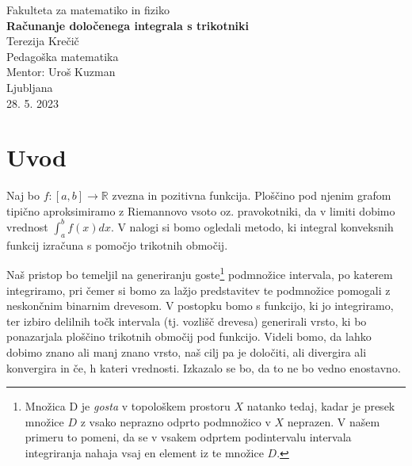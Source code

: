\documentclass[a4paper, 12pt, titlepage]{article}
\begin{document}
\begin{titlepage}
    \begin{center}
        \large
        Fakulteta za matematiko in fiziko\\
        \vspace{8cm}
        \Huge
        \textbf{Računanje določenega integrala s trikotniki} \\
        \vspace{7cm}
        \large
        Terezija Krečič\\
        Pedagoška matematika\\
        \vspace{1cm}
        Mentor: Uroš Kuzman\\
        \vspace{0.5cm}
        Ljubljana\\
        28. 5. 2023
    \end{center}
\end{titlepage}

\tableofcontents
\newpage

\section{Uvod}

Naj bo $ f: [a,b] \rightarrow \mathbb{R} $ zvezna in pozitivna funkcija. Ploščino pod njenim grafom tipično aproksimiramo z Riemannovo vsoto oz. pravokotniki, da v limiti dobimo vrednost $ \int_{a}^{b}f(x)dx $. V nalogi si bomo ogledali metodo, ki integral konveksnih funkcij izračuna s pomočjo trikotnih območij.

Naš pristop bo temeljil na generiranju goste\footnote{Množica D je \emph{gosta} v topološkem prostoru $ X $ natanko tedaj, kadar je presek množice $ D $ z vsako neprazno odprto podmnožico v $ X $ neprazen. V našem primeru to pomeni, da se v vsakem odprtem podintervalu intervala integriranja nahaja vsaj en element iz te množice $ D $.} podmnožice intervala, po katerem integriramo, pri čemer si bomo za lažjo predstavitev te podmnožice pomogali z neskončnim binarnim drevesom. V postopku bomo s funkcijo, ki jo integriramo, ter izbiro delilnih točk intervala (tj. vozlišč drevesa) generirali vrsto, ki bo ponazarjala ploščino trikotnih območij pod funkcijo. Videli bomo, da lahko dobimo znano ali manj znano vrsto, naš cilj pa je določiti, ali divergira ali konvergira in če, h kateri vrednosti. Izkazalo se bo, da to ne bo vedno enostavno.
\end{document}
